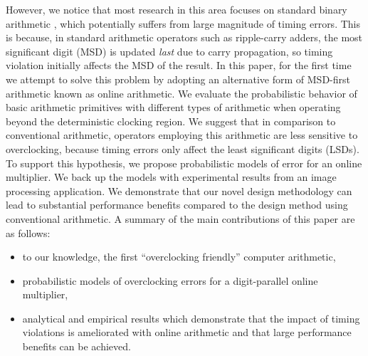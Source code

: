 \documentclass{acm_proc_article-sp}
\begin{document}
However, we notice that most research in this area focuses on standard binary arithmetic \cite{SKfccm13,Gupta2013TransCADICS,Undersigned2x2multiplier}, which potentially suffers from large magnitude of timing errors. This is because, in standard arithmetic operators such as ripple-carry adders, the most significant digit (MSD) is updated \emph{last} due to carry propagation, so timing violation initially affects the MSD of the result. In this paper, for the first time we attempt to solve this problem by adopting an alternative form of MSD-first arithmetic known as online arithmetic. We evaluate the probabilistic behavior of basic arithmetic primitives with different types of arithmetic when operating beyond the deterministic clocking region. We suggest that in comparison to conventional arithmetic, operators employing this arithmetic are less sensitive to overclocking, because timing errors only affect the least significant digits (LSDs). To support this hypothesis, we propose probabilistic models of error for an online multiplier. We back up the models with experimental results from an image processing application. We demonstrate that our novel design methodology can lead to substantial performance benefits compared to the design method using conventional arithmetic. A summary of the main contributions of this paper are as follows:
%
\begin{itemize}
\vspace{-2ex}
  \item to our knowledge, the first ``overclocking friendly'' computer arithmetic,\vspace{-.7ex}
  \item probabilistic models of overclocking errors for a digit-parallel online multiplier,\vspace{-.7ex}
  \item analytical and empirical results which demonstrate that the impact of timing violations is ameliorated with online arithmetic and that large performance benefits can be achieved.\vspace{-.7ex}
\end{itemize}



\end{document}
